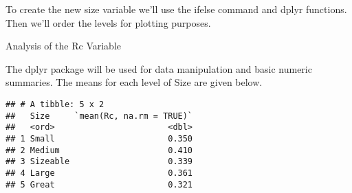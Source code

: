 \documentclass[]{article}
\newenvironment{Shaded}{\begin{snugshade}}{\end{snugshade}}
\newcommand{\KeywordTok}[1]{\textcolor[rgb]{0.13,0.29,0.53}{\textbf{#1}}}
\newcommand{\DataTypeTok}[1]{\textcolor[rgb]{0.13,0.29,0.53}{#1}}
\newcommand{\DecValTok}[1]{\textcolor[rgb]{0.00,0.00,0.81}{#1}}
\newcommand{\StringTok}[1]{\textcolor[rgb]{0.31,0.60,0.02}{#1}}
\newcommand{\OtherTok}[1]{\textcolor[rgb]{0.56,0.35,0.01}{#1}}
\newcommand{\OperatorTok}[1]{\textcolor[rgb]{0.81,0.36,0.00}{\textbf{#1}}}
\newcommand{\NormalTok}[1]{#1}
\begin{document}
To create the new size variable we'll use the ifelse command and dplyr
functions. Then we'll order the levels for plotting purposes.

\begin{Shaded}
\end{Shaded}

Analysis of the Rc Variable

The dplyr package will be used for data manipulation and basic numeric
summaries. The means for each level of Size are given below.

\begin{Shaded}
\end{Shaded}

\begin{verbatim}
## # A tibble: 5 x 2
##   Size     `mean(Rc, na.rm = TRUE)`
##   <ord>                       <dbl>
## 1 Small                       0.350
## 2 Medium                      0.410
## 3 Sizeable                    0.339
## 4 Large                       0.361
## 5 Great                       0.321
\end{verbatim}
\end{document}
